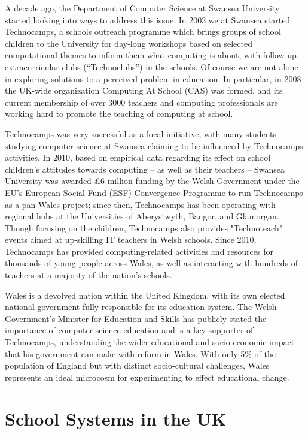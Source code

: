 \documentclass{sig-alternate}
\begin{document}
A decade ago, the Department of Computer Science at Swansea University
started looking into ways to address this issue. In 2003 we at Swansea
started Technocamps, a schools outreach programme which brings groups
of school children to the University for day-long workshops based on
selected computational themes to inform them what computing is about,
with follow-up extracurricular clubs (``Technoclubs'') in the
schools. Of course we are not alone in exploring solutions to a
perceived problem in education. In particular, in 2008 the UK-wide
organization Computing At School (CAS) was formed, and its current
membership of over 3000 teachers and computing professionals are
working hard to promote the teaching of computing at school.

Technocamps was very successful as a local initiative, with many
students studying computer science at Swansea claiming to be
influenced by Technocamps activities. In 2010, based on empirical data
regarding its effect on school children's attitudes towards computing
-- as well as their teachers -- Swansea University was awarded £6
million funding by the Welsh Government under the EU's European Social
Fund (ESF) Convergence Programme to run Technocamps as a pan-Wales
project; since then, Technocamps has been operating with regional hubs
at the Universities of Aberystwyth, Bangor, and Glamorgan. Though
focusing on the children, Technocamps also provides "Technoteach"
events aimed at up-skilling IT teachers in Welsh schools. Since 2010,
Technocamps has provided computing-related activities and resources
for thousands of young people across Wales, as well as interacting
with hundreds of teachers at a majority of the nation's schools.

Wales is a devolved nation within the United Kingdom, with its own
elected national government fully responsible for its education
system. The Welsh Government's Minister for Education and Skills has
publicly stated the importance of computer science education and is a
key supporter of Technocamps, understanding the wider educational and
socio-economic impact that his government can make with reform in
Wales. With only 5\% of the population of England but with distinct
socio-cultural challenges, Wales represents an ideal microcosm for
experimenting to effect educational change.

\section{School Systems in the UK}\label{sec:schools}
\end{document}
